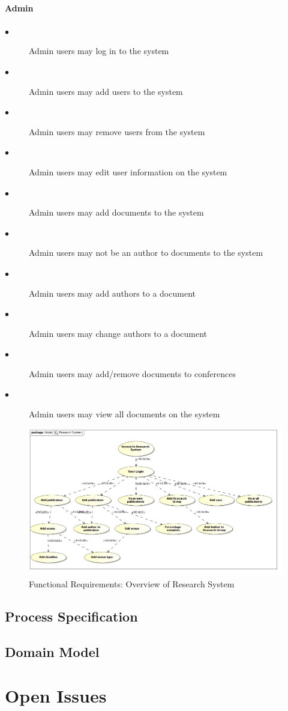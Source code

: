 \documentclass[a4paper]{article}
\begin{document}
\paragraph{\textbf{Admin}}
\begin{description}
  \item[$\bullet$] Admin users may log in to the system
    \item[$\bullet$] Admin users may add users to the system
    \item[$\bullet$] Admin users may remove users from the system
    \item[$\bullet$] Admin users may edit user information on the system
    \item[$\bullet$] Admin users may add documents to the system
    \item[$\bullet$] Admin users may not be an author to documents to the system
    \item[$\bullet$] Admin users may add authors to a document
    \item[$\bullet$] Admin users may change authors to a document
    \item[$\bullet$] Admin users may add/remove documents to conferences
    \item[$\bullet$] Admin users may view all documents on the system
\end{description}
\begin{figure}[H]
\includegraphics[width=\textwidth]{Overview.jpg}
\caption{Functional Requirements: Overview of Research System \label{overflow}}
\end{figure}
\subsection{Process Specification}
\subsection{Domain Model}


\section{Open Issues}
\end{document}
